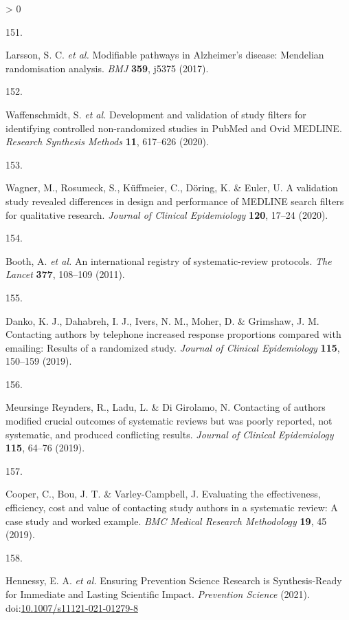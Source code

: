 \documentclass[a4paper, twoside]{templates/ociamthesis}
\newlength{\cslhangindent}
\newlength{\csllabelwidth}
\newenvironment{CSLReferences}[3] %
 {%
  \setlength{\parindent}{0pt}
  \ifodd #1 \everypar{\setlength{\hangindent}{\cslhangindent}}\ignorespaces\fi
  \ifnum #2 > 0
  \setlength{\parskip}{#2\baselineskip}
  \fi
 }%
 {}
\newcommand{\CSLLeftMargin}[1]{\parbox[t]{\maxof{\widthof{#1}}{\csllabelwidth}}{#1}}
\newcommand{\CSLRightInline}[1]{\parbox[t]{\linewidth - \csllabelwidth}{#1}}
\begin{document}
\begin{CSLReferences}{0}{0}
\leavevmode\hypertarget{ref-larsson2017b}{}%
\CSLLeftMargin{151. }
\CSLRightInline{Larsson, S. C. \emph{et al.} Modifiable pathways in {Alzheimer}'s disease: {Mendelian} randomisation analysis. \emph{BMJ} \textbf{359}, j5375 (2017).}

\leavevmode\hypertarget{ref-waffenschmidt2020}{}%
\CSLLeftMargin{152. }
\CSLRightInline{Waffenschmidt, S. \emph{et al.} Development and validation of study filters for identifying controlled non-randomized studies in {PubMed} and {Ovid MEDLINE}. \emph{Research Synthesis Methods} \textbf{11}, 617--626 (2020).}

\leavevmode\hypertarget{ref-wagner2020}{}%
\CSLLeftMargin{153. }
\CSLRightInline{Wagner, M., Rosumeck, S., Küffmeier, C., Döring, K. \& Euler, U. A validation study revealed differences in design and performance of {MEDLINE} search filters for qualitative research. \emph{Journal of Clinical Epidemiology} \textbf{120}, 17--24 (2020).}

\leavevmode\hypertarget{ref-booth2011}{}%
\CSLLeftMargin{154. }
\CSLRightInline{Booth, A. \emph{et al.} An international registry of systematic-review protocols. \emph{The Lancet} \textbf{377}, 108--109 (2011).}

\leavevmode\hypertarget{ref-danko2019}{}%
\CSLLeftMargin{155. }
\CSLRightInline{Danko, K. J., Dahabreh, I. J., Ivers, N. M., Moher, D. \& Grimshaw, J. M. Contacting authors by telephone increased response proportions compared with emailing: Results of a randomized study. \emph{Journal of Clinical Epidemiology} \textbf{115}, 150--159 (2019).}

\leavevmode\hypertarget{ref-meursingereynders2019}{}%
\CSLLeftMargin{156. }
\CSLRightInline{Meursinge Reynders, R., Ladu, L. \& Di Girolamo, N. Contacting of authors modified crucial outcomes of systematic reviews but was poorly reported, not systematic, and produced conflicting results. \emph{Journal of Clinical Epidemiology} \textbf{115}, 64--76 (2019).}

\leavevmode\hypertarget{ref-cooper2019}{}%
\CSLLeftMargin{157. }
\CSLRightInline{Cooper, C., Bou, J. T. \& Varley-Campbell, J. Evaluating the effectiveness, efficiency, cost and value of contacting study authors in a systematic review: A case study and worked example. \emph{BMC Medical Research Methodology} \textbf{19}, 45 (2019).}

\leavevmode\hypertarget{ref-hennessy2021}{}%
\CSLLeftMargin{158. }
\CSLRightInline{Hennessy, E. A. \emph{et al.} Ensuring {Prevention Science Research} is {Synthesis}-{Ready} for {Immediate} and {Lasting Scientific Impact}. \emph{Prevention Science} (2021). doi:\href{https://doi.org/10.1007/s11121-021-01279-8}{10.1007/s11121-021-01279-8}}


\end{CSLReferences}
\end{document}
